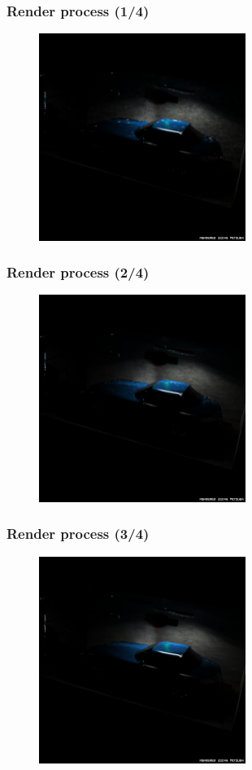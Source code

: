 \documentclass{beamer}
\begin{document}
\begin{frame}
    \frametitle{Render process (1/4)}
    \begin{figure}
        \centering
        \includegraphics[width=0.6\textwidth]{img/SLS/1.png}
    \end{figure}
\end{frame}
\begin{frame}
    \frametitle{Render process (2/4)}
    \begin{figure}
        \centering
        \includegraphics[width=0.6\textwidth]{img/SLS/2.png}
    \end{figure}
\end{frame}
\begin{frame}
    \frametitle{Render process (3/4)}
    \begin{figure}
        \centering
        \includegraphics[width=0.6\textwidth]{img/SLS/3.png}
    \end{figure}
\end{frame}
\end{document}
